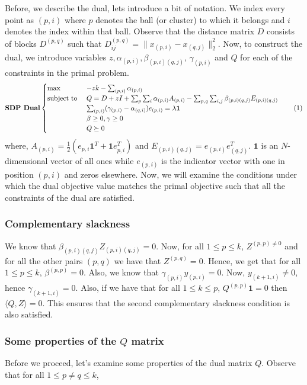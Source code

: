 \documentclass[12pt]{article}
\newcommand{\mb}{\mathbf}
\newcommand\numberthis{\addtocounter{equation}{1}\tag{\theequation}}
\begin{document}
Before, we describe the dual, lets introduce a bit of notation. We index every point as $(p, i)$ where $p$ denotes the ball (or cluster) to which it belongs and $i$ denotes the index within that ball. Observe that the distance matrix $D$ consists of blocks $D^{(p, q)}$ such that $D^{(p,q)}_{ij} = \|x_{(p,i)}-x_{(q,j)}\|^2_2$. Now, to construct the dual, we introduce variables $z, \alpha_{(p,i)}, \beta_{(p,i)(q,j)}$, $\gamma_{(p, i)}$ and $Q$ for each of the constraints in the primal problem. 
\[\textbf{SDP Dual}
    \begin{cases}
		\max \enspace &-zk - \sum_{(p, i)} \alpha_{(p,i)}\\
		\text{subject to } 
		&Q = D + zI + \sum_p\sum_i \alpha_{(p,i)}A_{(p, i)} -\sum_{p,q}\sum_{i,j} \beta_{(p,i)(q,j)}E_{(p,i)(q,j)}\\
		&\sum_{(p,i)} (\gamma_{(p,i)}-\alpha_{(q,i)}) e_{(p, i)} = \lambda \mb 1\\
		&\beta \ge 0, \gamma \ge 0 \\
		&Q \succeq 0
	\end{cases}
	\label{a-eqn:resularisedSDPDual}
	\numberthis
\]
where, $A_{(p,i)} = \frac{1}{2}(e_{p,i}\mb 1^T + \mb 1 e_{p, i}^T)$ and $E_{(p,i)(q,j)} = e_{(p,i)}e_{(q,j)}^T$. $\mb 1$ is an $N$-dimensional vector of all ones while $e_{(p,i)}$ is the indicator vector with one in position $(p, i)$ and zeros elsewhere. Now, we will examine the conditions under which the dual objective value matches the primal objective such that all the constraints of the dual are satisfied. 

\subsubsection*{Complementary slackness}
We know that $\beta_{(p, i)(q, j)} Z_{(p, i)(q, j)} = 0$. Now, for all $1 \le p \le k$, $Z^{(p, p) \neq 0}$ and for all the other pairs $(p, q)$ we have that $Z^{(p, q)} = 0$. Hence, we get that for all $1 \le p \le k$, $\beta^{(p, p)} = 0$. Also, we know that $\gamma_{(p, i)} y_{(p,i)} = 0$. Now, $y_{(k+1, i)} \neq 0$, hence $\gamma_{(k+1, i)} = 0$. Also, if we have that for all $1 \le k \le p$, $Q^{(p,p)}\mb1 = 0$ then $\langle Q, Z \rangle = 0$. This ensures that the second complementary slackness condition is also satisfied. 

\subsubsection*{Some properties of the $Q$ matrix}
Before we proceed, let's examine some properties of the dual matrix $Q$. Observe that for all $1 \le p\neq q \le k$, 
\end{document}
